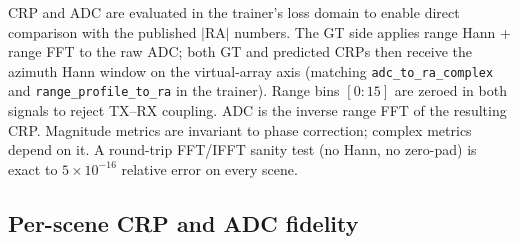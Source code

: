 CRP and ADC are evaluated in the trainer's loss domain to enable direct comparison with the published $|\mathrm{RA}|$ numbers. The GT side applies range Hann + range FFT to the raw ADC; both GT and predicted CRPs then receive the azimuth Hann window on the virtual-array axis (matching \texttt{adc\_to\_ra\_complex} and \texttt{range\_profile\_to\_ra} in the trainer). Range bins $[0{:}15]$ are zeroed in both signals to reject TX--RX coupling. ADC is the inverse range FFT of the resulting CRP. Magnitude metrics are invariant to phase correction; complex metrics depend on it. A round-trip FFT/IFFT sanity test (no Hann, no zero-pad) is exact to $5\!\times\!10^{-16}$ relative error on every scene.

\subsection{Per-scene CRP and ADC fidelity}
\label{app:rdadc:per_scene}

